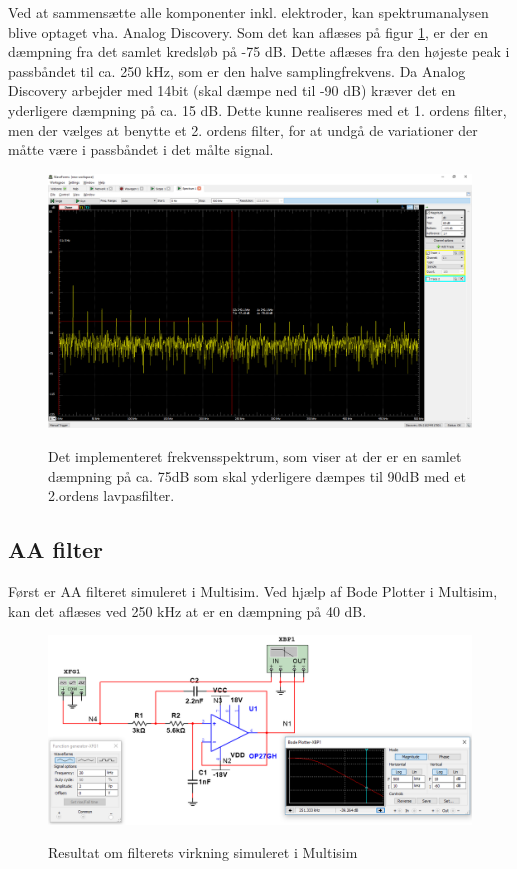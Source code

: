 Ved at sammensætte alle komponenter inkl. elektroder, kan spektrumanalysen blive optaget vha. Analog Discovery. Som det kan aflæses på figur \ref{fig:aaspectrum1}, er der en dæmpning fra det samlet kredsløb på -75 dB. Dette aflæses fra den højeste peak i passbåndet til ca. 250 kHz, som er den halve samplingfrekvens. Da Analog Discovery arbejder med 14bit (skal dæmpe ned til -90 dB) kræver det en yderligere dæmpning på ca. 15 dB. Dette kunne realiseres med et 1. ordens filter, men der vælges at benytte et 2. ordens filter, for at undgå de variationer der måtte være i passbåndet i det målte signal.


\begin{figure}[H] 
\centering
{\includegraphics[width=\linewidth]
{Figure/aaspectrum1}}
\caption{Det implementeret frekvensspektrum, som viser at der er en samlet dæmpning på ca. 75dB som skal yderligere dæmpes til 90dB med et 2.ordens lavpasfilter.}
\label{fig:aaspectrum1}
\end{figure}


\subsection{AA filter}

Først er AA filteret simuleret i Multisim. Ved hjælp af Bode Plotter i Multisim, kan det aflæses ved 250 kHz at er en dæmpning på 40 dB.


\begin{figure}[H] 
\centering
{\includegraphics[width=\linewidth]
{Figure/aafilterbodemultisim}}
\caption{Resultat om filterets virkning simuleret i Multisim}
\label{fig:aafilterbodemultisim}
\end{figure}

